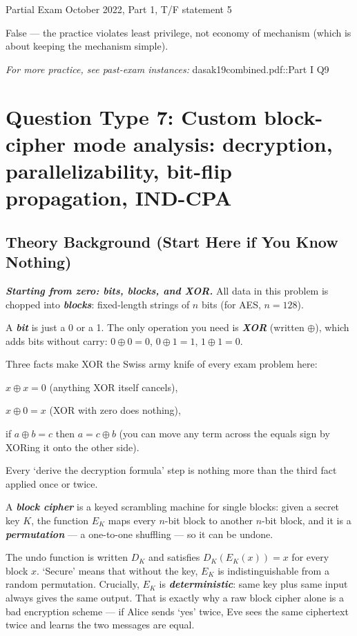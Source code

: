 \documentclass[12pt, a4paper]{article}
\newcommand{\term}[1]{\textbf{\textit{#1}}}        %
\begin{document}
\begin{practicebox}{Partial Exam October 2022, Part 1, T/F statement 5}
\begin{answerbox}
False --- the practice violates least privilege, not economy of mechanism (which is about keeping the mechanism simple).
\end{answerbox}
\end{practicebox}

\textit{For more practice, see past-exam instances:} dasak19combined.pdf::Part I Q9

\section{Question Type 7: Custom block-cipher mode analysis: decryption, parallelizability, bit-flip propagation, IND-CPA}

\subsection*{Theory Background (Start Here if You Know Nothing)}

\term{Starting from zero: bits, blocks, and XOR.} All data in this problem is chopped into \term{blocks}: fixed-length strings of $n$ bits (for AES, $n = 128$).

A \term{bit} is just a 0 or a 1. The only operation you need is \term{XOR} (written $\oplus$), which adds bits without carry: $0 \oplus 0 = 0$, $0 \oplus 1 = 1$, $1 \oplus 1 = 0$.

Three facts make XOR the Swiss army knife of every exam problem here:
\begin{tightitem}
    \item $x \oplus x = 0$ (anything XOR itself cancels),
    \item $x \oplus 0 = x$ (XOR with zero does nothing),
    \item if $a \oplus b = c$ then $a = c \oplus b$ (you can move any term across the equals sign by XORing it onto the other side).
\end{tightitem}
Every `derive the decryption formula' step is nothing more than the third fact applied once or twice.

A \term{block cipher} is a keyed scrambling machine for single blocks: given a secret key $K$, the function $E_K$ maps every $n$-bit block to another $n$-bit block, and it is a \term{permutation} --- a one-to-one shuffling --- so it can be undone.

The undo function is written $D_K$ and satisfies $D_K(E_K(x)) = x$ for every block $x$. `Secure' means that without the key, $E_K$ is indistinguishable from a random permutation.
Crucially, $E_K$ is \term{deterministic}: same key plus same input always gives the same output. That is exactly why a raw block cipher alone is a bad encryption scheme --- if Alice sends `yes' twice, Eve sees the same ciphertext twice and learns the two messages are equal.
\end{document}
